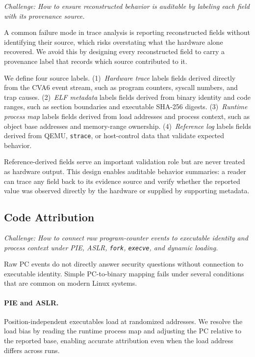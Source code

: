 \emph{Challenge: How to ensure reconstructed behavior is auditable by
labeling each field with its provenance source.}



A common failure mode in trace analysis is reporting reconstructed fields
without identifying their source, which risks overstating what the hardware
alone recovered.
We avoid this by designing every reconstructed field to carry a provenance
label that records which source contributed to it.

We define four source labels.
(1)~\emph{Hardware trace} labels fields derived directly from the CVA6
event stream, such as program counters, syscall numbers, and trap causes.
(2)~\emph{ELF metadata} labels fields derived from binary identity and
code ranges, such as section boundaries and executable SHA-256 digests.
(3)~\emph{Runtime process map} labels fields derived from load addresses
and process context, such as object base addresses and memory-range
ownership.
(4)~\emph{Reference log} labels fields derived from QEMU, \texttt{strace},
or host-control data that validate expected behavior.

Reference-derived fields serve an important validation role but are never
treated as hardware output.
This design enables auditable behavior summaries: a reader can trace any
field back to its evidence source and verify whether the reported value
was observed directly by the hardware or supplied by supporting metadata.

\subsection{Code Attribution}
\label{sec:design:attribution}

\emph{Challenge: How to connect raw program-counter events to executable
identity and process context under PIE, ASLR, \texttt{fork}, \texttt{execve},
and dynamic loading.}

Raw PC events do not directly answer security questions without connection
to executable identity.
Simple PC-to-binary mapping fails under several conditions that are
common on modern Linux systems.

\paragraph{PIE and ASLR.}
Position-independent executables load at randomized addresses.
We resolve the load bias by reading the runtime process map and adjusting
the PC relative to the reported base, enabling accurate attribution even
when the load address differs across runs.

